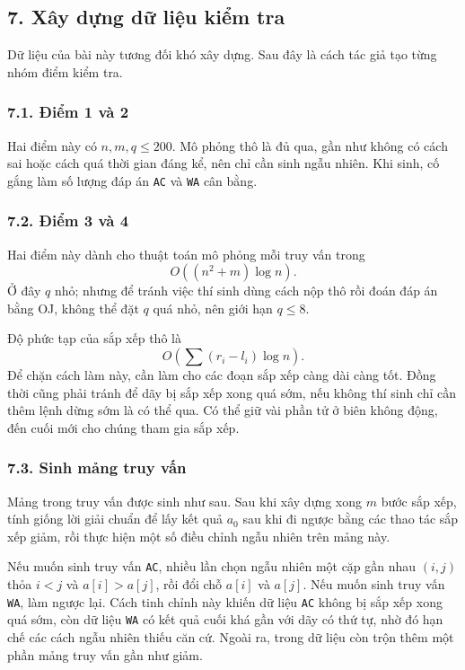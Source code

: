 \documentclass[11pt]{article}
\begin{document}
\subsection*{7. Xây dựng dữ liệu kiểm tra}

Dữ liệu của bài này tương đối khó xây dựng. Sau đây là cách tác giả tạo từng
nhóm điểm kiểm tra.

\subsubsection*{7.1. Điểm 1 và 2}

Hai điểm này có \(n,m,q\le 200\). Mô phỏng thô là đủ qua, gần như không có
cách sai hoặc cách quá thời gian đáng kể, nên chỉ cần sinh ngẫu nhiên. Khi
sinh, cố gắng làm số lượng đáp án \texttt{AC} và \texttt{WA} cân bằng.

\subsubsection*{7.2. Điểm 3 và 4}

Hai điểm này dành cho thuật toán mô phỏng mỗi truy vấn trong
\[
  O((n^2+m)\log n).
\]
Ở đây \(q\) nhỏ; nhưng để tránh việc thí sinh dùng cách nộp thô rồi đoán đáp
án bằng OJ, không thể đặt \(q\) quá nhỏ, nên giới hạn \(q\le 8\).

Độ phức tạp của sắp xếp thô là
\[
  O\left(\sum (r_i-l_i)\log n\right).
\]
Để chặn cách làm này, cần làm cho các đoạn sắp xếp càng dài càng tốt. Đồng
thời cũng phải tránh để dãy bị sắp xếp xong quá sớm, nếu không thí sinh chỉ
cần thêm lệnh dừng sớm là có thể qua. Có thể giữ vài phần tử ở biên không
động, đến cuối mới cho chúng tham gia sắp xếp.

\subsubsection*{7.3. Sinh mảng truy vấn}

Mảng trong truy vấn được sinh như sau. Sau khi xây dựng xong \(m\) bước sắp
xếp, tính giống lời giải chuẩn để lấy kết quả \(a_0\) sau khi đi ngược bằng
các thao tác sắp xếp giảm, rồi thực hiện một số điều chỉnh ngẫu nhiên trên
mảng này.

Nếu muốn sinh truy vấn \texttt{AC}, nhiều lần chọn ngẫu nhiên một cặp gần
nhau \((i,j)\) thỏa \(i<j\) và \(a[i]>a[j]\), rồi đổi chỗ \(a[i]\) và
\(a[j]\). Nếu muốn sinh truy vấn \texttt{WA}, làm ngược lại. Cách tinh chỉnh
này khiến dữ liệu \texttt{AC} không bị sắp xếp xong quá sớm, còn dữ liệu
\texttt{WA} có kết quả cuối khá gần với dãy có thứ tự, nhờ đó hạn chế các
cách ngẫu nhiên thiếu căn cứ. Ngoài ra, trong dữ liệu còn trộn thêm một phần
mảng truy vấn gần như giảm.
\end{document}
